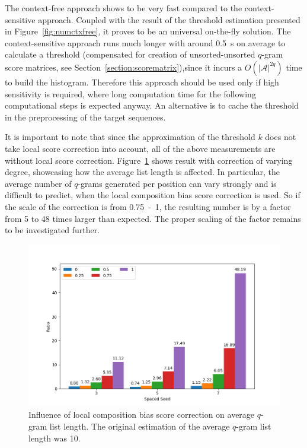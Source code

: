 \documentclass[twoside,a4paper,bsc]{master}
\newcommand{\Qgram}[1]{\(#1\)-gram}
\newcommand{\Alpha}[0]{\mathcal{A}}
\begin{document}
The context-free approach shows to be very fast compared to the 
context-sensitive approach.
Coupled with the result of the threshold estimation presented in 
Figure~\ref{fig:numctxfree}, it proves to be an
universal on-the-fly solution. The context-sensitive approach runs much longer
with around 0.5~s on average to calculate a threshold (compensated for
creation of unsorted-unsorted \Qgram{q} score matrices, see
Section~\ref{section:scorematrix}),since it incurs a \(O(|\Alpha|^{2q})\)
time to build the histogram. Therefore this approach should be used only if
high sensitivity is required, where long computation time for the following
computational steps is expected anyway. An alternative is to cache the
threshold in the preprocessing of the target sequences.

It is important to note that since the approximation of the threshold \(k\)
does not take local score correction into account, all of the above
measurements are without local score correction.
Figure~\ref{fig:compbias} shows result with correction of varying
degree, showcasing how the average list length is affected. In particular,
the average number of \Qgram{q}s generated per position can vary strongly
and is difficult to predict, when the
local composition bias score correction is used. So if the scale
of the correction is from 0.75~-~1, the resulting number is by a factor from
5 to 48 times larger than expected. The proper scaling of the
factor remains to be investigated further.

\begin{figure}
\centering
\includegraphics[scale=0.6]{graphics/comp_bias.png}
\caption{Influence of local composition bias score correction on average
\Qgram{q} list length. The original estimation of the average
\Qgram{q} list length was 10.}
\label{fig:compbias}
\end{figure}
\end{document}
